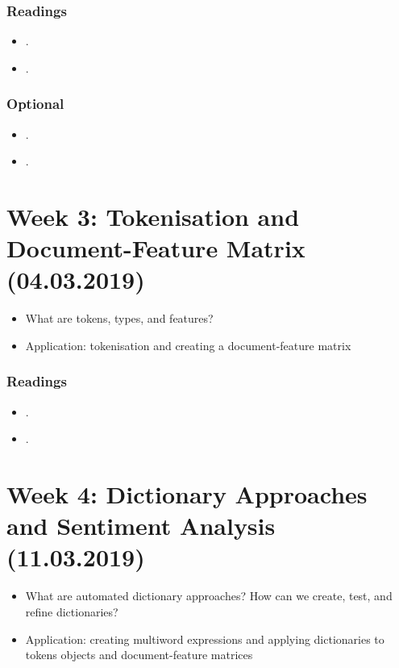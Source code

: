 \documentclass[abstract=on,parskip=full,headings=standardclasses,fontsize=11pt,paper=a4]{scrartcl}
\begin{document}
\subsubsection*{Readings}
\begin{itemize}
\item {}.
\item {}.
\end{itemize}


\subsubsection*{Optional}
\begin{itemize}
\item {}.
\item {}.
\end{itemize}

\section{Week 3:  Tokenisation and Document-Feature Matrix (04.03.2019)}

\begin{itemize}
\item What are tokens, types, and features?
\item Application: tokenisation and creating a document-feature matrix
\end{itemize}

\subsubsection*{Readings}
\begin{itemize}
 \item {}.
 \item {}.
\end{itemize}
 
  
\section{Week 4: Dictionary Approaches and Sentiment Analysis (11.03.2019)}

\begin{itemize}
\item What are automated dictionary approaches? How can we create, test, and refine dictionaries?
\item Application: creating multiword expressions and applying dictionaries to tokens objects and document-feature matrices
\end{itemize}
\end{document}
